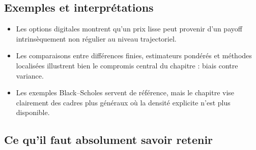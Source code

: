 \documentclass[11pt,a4paper]{article}
\begin{document}
\subsection{Exemples et interprétations}

\begin{itemize}
  \item Les options digitales montrent qu'un prix lisse peut provenir d'un payoff intrinsèquement non régulier au niveau trajectoriel.
  \item Les comparaisons entre différences finies, estimateurs pondérés et méthodes localisées illustrent bien le compromis central du chapitre : biais contre variance.
  \item Les exemples Black--Scholes servent de référence, mais le chapitre vise clairement des cadres plus généraux où la densité explicite n'est plus disponible.
\end{itemize}

\subsection{Ce qu'il faut absolument savoir retenir}
\end{document}
